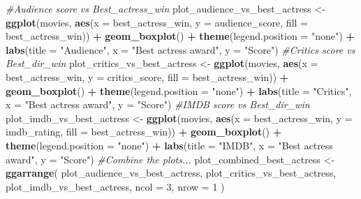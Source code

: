 \documentclass[]{article}
\newenvironment{Shaded}{\begin{snugshade}}{\end{snugshade}}
\newcommand{\CommentTok}[1]{\textcolor[rgb]{0.56,0.35,0.01}{\textit{#1}}}
\newcommand{\DataTypeTok}[1]{\textcolor[rgb]{0.13,0.29,0.53}{#1}}
\newcommand{\DecValTok}[1]{\textcolor[rgb]{0.00,0.00,0.81}{#1}}
\newcommand{\KeywordTok}[1]{\textcolor[rgb]{0.13,0.29,0.53}{\textbf{#1}}}
\newcommand{\NormalTok}[1]{#1}
\newcommand{\OperatorTok}[1]{\textcolor[rgb]{0.81,0.36,0.00}{\textbf{#1}}}
\newcommand{\StringTok}[1]{\textcolor[rgb]{0.31,0.60,0.02}{#1}}
\begin{document}
\begin{Shaded}
\begin{Highlighting}[]
\CommentTok{#Audience score vs Best_actress_win}
\NormalTok{plot_audience_vs_best_actress <-}
\StringTok{  }\KeywordTok{ggplot}\NormalTok{(movies,}
         \KeywordTok{aes}\NormalTok{(}\DataTypeTok{x =}\NormalTok{ best_actress_win, }\DataTypeTok{y =}\NormalTok{ audience_score, }\DataTypeTok{fill =}\NormalTok{ best_actress_win)) }\OperatorTok{+}
\StringTok{  }\KeywordTok{geom_boxplot}\NormalTok{() }\OperatorTok{+}\StringTok{ }\KeywordTok{theme}\NormalTok{(}\DataTypeTok{legend.position =} \StringTok{"none"}\NormalTok{) }\OperatorTok{+}\StringTok{ }\KeywordTok{labs}\NormalTok{(}\DataTypeTok{title =} \StringTok{"Audience"}\NormalTok{, }\DataTypeTok{x =} \StringTok{"Best actress award"}\NormalTok{, }\DataTypeTok{y =} \StringTok{"Score"}\NormalTok{)}
\CommentTok{#Critics score vs Best_dir_win}
\NormalTok{plot_critics_vs_best_actress <-}
\StringTok{  }\KeywordTok{ggplot}\NormalTok{(movies,}
         \KeywordTok{aes}\NormalTok{(}\DataTypeTok{x =}\NormalTok{ best_actress_win, }\DataTypeTok{y =}\NormalTok{ critics_score, }\DataTypeTok{fill =}\NormalTok{ best_actress_win)) }\OperatorTok{+}
\StringTok{  }\KeywordTok{geom_boxplot}\NormalTok{() }\OperatorTok{+}\StringTok{ }\KeywordTok{theme}\NormalTok{(}\DataTypeTok{legend.position =} \StringTok{"none"}\NormalTok{) }\OperatorTok{+}\StringTok{ }\KeywordTok{labs}\NormalTok{(}\DataTypeTok{title =} \StringTok{"Critics"}\NormalTok{, }\DataTypeTok{x =} \StringTok{"Best actress award"}\NormalTok{, }\DataTypeTok{y =} \StringTok{"Score"}\NormalTok{)}
\CommentTok{#IMDB score vs Best_dir_win}
\NormalTok{plot_imdb_vs_best_actress <-}
\StringTok{  }\KeywordTok{ggplot}\NormalTok{(movies,}
         \KeywordTok{aes}\NormalTok{(}\DataTypeTok{x =}\NormalTok{ best_actress_win, }\DataTypeTok{y =}\NormalTok{ imdb_rating, }\DataTypeTok{fill =}\NormalTok{ best_actress_win)) }\OperatorTok{+}
\StringTok{  }\KeywordTok{geom_boxplot}\NormalTok{() }\OperatorTok{+}\StringTok{ }\KeywordTok{theme}\NormalTok{(}\DataTypeTok{legend.position =} \StringTok{"none"}\NormalTok{) }\OperatorTok{+}\StringTok{ }\KeywordTok{labs}\NormalTok{(}\DataTypeTok{title =} \StringTok{"IMDB"}\NormalTok{, }\DataTypeTok{x =} \StringTok{"Best actress award"}\NormalTok{, }\DataTypeTok{y =} \StringTok{"Score"}\NormalTok{)}
\CommentTok{#Combine the plots...}
\NormalTok{plot_combined_best_actress <-}
\StringTok{  }\KeywordTok{ggarrange}\NormalTok{(}
\NormalTok{    plot_audience_vs_best_actress,}
\NormalTok{    plot_critics_vs_best_actress,}
\NormalTok{    plot_imdb_vs_best_actress,}
    \DataTypeTok{ncol =} \DecValTok{3}\NormalTok{,}
    \DataTypeTok{nrow =} \DecValTok{1}
\NormalTok{  )}
\end{Highlighting}
\end{Shaded}
\end{document}
